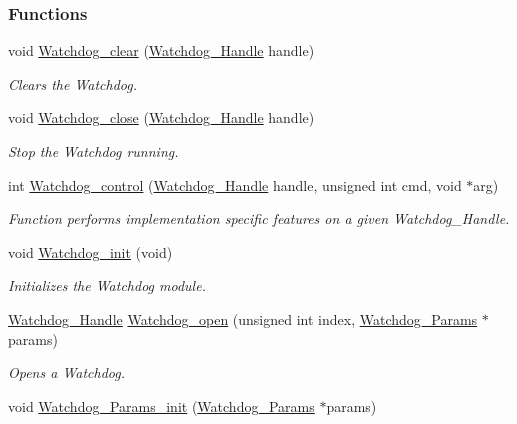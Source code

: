\subsubsection*{Functions}
\begin{DoxyCompactItemize}
\item 
void \hyperlink{_watchdog_8h_a396decd6b1807db10c636f9987c3be4c}{Watchdog\-\_\-clear} (\hyperlink{_watchdog_8h_a00ed22749c947ef200434eeec507f90d}{Watchdog\-\_\-\-Handle} handle)
\begin{DoxyCompactList}\small\item\em Clears the Watchdog. \end{DoxyCompactList}\item 
void \hyperlink{_watchdog_8h_a1c0dfea7011b06f303d01afb631ffbdd}{Watchdog\-\_\-close} (\hyperlink{_watchdog_8h_a00ed22749c947ef200434eeec507f90d}{Watchdog\-\_\-\-Handle} handle)
\begin{DoxyCompactList}\small\item\em Stop the Watchdog running. \end{DoxyCompactList}\item 
int \hyperlink{_watchdog_8h_aa98a75361edb1e476432669169f2950e}{Watchdog\-\_\-control} (\hyperlink{_watchdog_8h_a00ed22749c947ef200434eeec507f90d}{Watchdog\-\_\-\-Handle} handle, unsigned int cmd, void $\ast$arg)
\begin{DoxyCompactList}\small\item\em Function performs implementation specific features on a given Watchdog\-\_\-\-Handle. \end{DoxyCompactList}\item 
void \hyperlink{_watchdog_8h_afaadfb59be17661ae95562f2081355e7}{Watchdog\-\_\-init} (void)
\begin{DoxyCompactList}\small\item\em Initializes the Watchdog module. \end{DoxyCompactList}\item 
\hyperlink{_watchdog_8h_a00ed22749c947ef200434eeec507f90d}{Watchdog\-\_\-\-Handle} \hyperlink{_watchdog_8h_aa5ce656aa6d5199e1efdb4ca2cd9fb7c}{Watchdog\-\_\-open} (unsigned int index, \hyperlink{struct_watchdog___params}{Watchdog\-\_\-\-Params} $\ast$params)
\begin{DoxyCompactList}\small\item\em Opens a Watchdog. \end{DoxyCompactList}\item 
void \hyperlink{_watchdog_8h_a6a6f54cfdac33d3bf33464a212262afc}{Watchdog\-\_\-\-Params\-\_\-init} (\hyperlink{struct_watchdog___params}{Watchdog\-\_\-\-Params} $\ast$params)

\end{DoxyCompactItemize}
